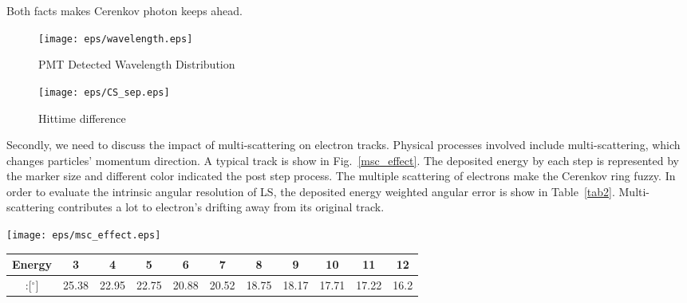 \documentclass[a4paper,10pt]{cpc-hepnp}
\begin{document}
Both facts makes Cerenkov photon keeps ahead.
\begin{figure}[htbp]
\centering
\begin{minipage}{0.5\textwidth}
\centering
\texttt{[image: eps/wavelength.eps]}
\caption{PMT Detected Wavelength Distribution}
\end{minipage}%
\begin{minipage}{0.5\textwidth}
\centering
\texttt{[image: eps/CS\_sep.eps]}
\caption{Hittime difference}
\end{minipage}
\end{figure}

Secondly, we need to discuss the impact of multi-scattering on electron tracks.
Physical processes involved include multi-scattering, which changes
particles' momentum direction. A typical track is show in
Fig.~\ref{msc_effect}. The deposited energy by each step is
represented by the marker size and different color indicated the post step
process. The multiple scattering of electrons make the Cerenkov ring fuzzy. In order to
evaluate the intrinsic angular resolution of LS, the deposited energy weighted
angular error is show in Table~\ref{tab2}. Multi-scattering
contributes a lot to electron's drifting away from its original track.
\begin{center}
\texttt{[image: eps/msc\_effect.eps]}
\end{center}


\begin{center}
\footnotesize
\begin{tabular*}{170mm}{@{\extracolsep{\fill}}ccccccccccc}
\toprule Energy&3&4&5&6&7&8&9&10&11&12\\
\hline
:[$^{\circ}$]&25.38&22.95&22.75&20.88&20.52&18.75&18.17&17.71&17.22&16.2\\
\bottomrule
\end{tabular*}
\end{center}
\end{document}
